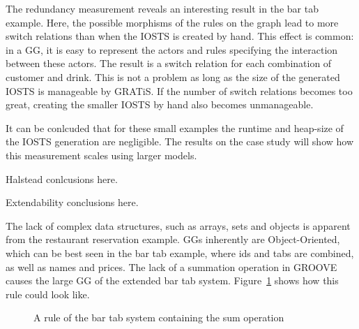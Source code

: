 The redundancy measurement reveals an interesting result in the bar tab example. Here, the possible morphisms of the rules on the graph lead to more switch relations than when the IOSTS is created by hand. This effect is common: in a GG, it is easy to represent the actors and rules specifying the interaction between these actors. The result is a switch relation for each combination of customer and drink. This is not a problem as long as the size of the generated IOSTS is manageable by GRATiS. If the number of switch relations becomes too great, creating the smaller IOSTS by hand also becomes unmanageable.


It can be conlcuded that for these small examples the runtime and heap-size of the IOSTS generation are negligible. The results on the case study will show how this measurement scales using larger models.

Halstead conlcusions here.

Extendability conclusions here.

The lack of complex data structures, such as arrays, sets and objects is apparent from the restaurant reservation example. GGs inherently are Object-Oriented, which can be best seen in the bar tab example, where ids and tabs are combined, as well as names and prices. The lack of a summation operation in GROOVE causes the large GG of the extended bar tab system. Figure~\ref{fig:gg-tab-better} shows how this rule could look like. 

\begin{figure}[ht]
  \begin{center}
    
  \end{center}
  \caption{A rule of the bar tab system containing the sum operation}
  \label{fig:gg-tab-better}
\end{figure}
